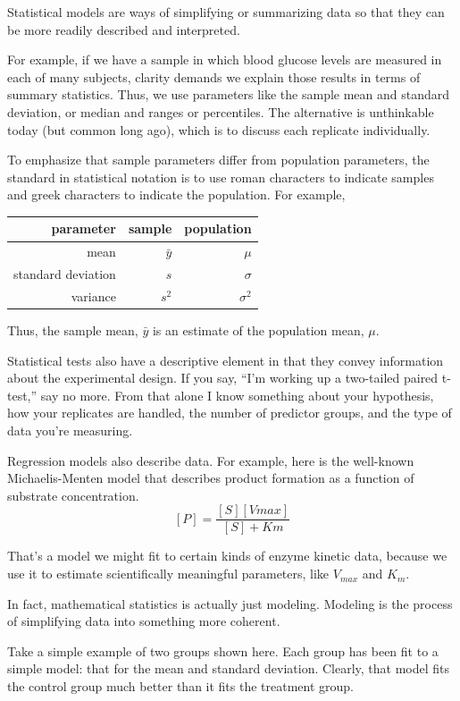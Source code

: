 \documentclass[]{book}
\begin{document}
Statistical models are ways of simplifying or summarizing data so that they can be more readily described and interpreted.

For example, if we have a sample in which blood glucose levels are measured in each of many subjects, clarity demands we explain those results in terms of summary statistics. Thus, we use parameters like the sample mean and standard deviation, or median and ranges or percentiles. The alternative is unthinkable today (but common long ago), which is to discuss each replicate individually.

To emphasize that sample parameters differ from population parameters, the standard in statistical notation is to use roman characters to indicate samples and greek characters to indicate the population. For example,

\begin{longtable}[]{@{}rrr@{}}
\toprule
parameter & sample & population\tabularnewline
\midrule
\endhead
mean & \(\bar y\) & \(\mu\)\tabularnewline
standard deviation & \(s\) & \(\sigma\)\tabularnewline
variance & \(s^2\) & \(\sigma^2\)\tabularnewline
\bottomrule
\end{longtable}

Thus, the sample mean, \(\bar y\) is an estimate of the population mean, \(\mu\).

Statistical tests also have a descriptive element in that they convey information about the experimental design. If you say, ``I'm working up a two-tailed paired t-test,'' say no more. From that alone I know something about your hypothesis, how your replicates are handled, the number of predictor groups, and the type of data you're measuring.

Regression models also describe data. For example, here is the well-known Michaelis-Menten model that describes product formation as a function of substrate concentration.\\
\[[P]=\frac{[S][Vmax]}{[S]+Km}\]

That's a model we might fit to certain kinds of enzyme kinetic data, because we use it to estimate scientifically meaningful parameters, like \(V_{max}\) and \(K_m\).

In fact, mathematical statistics is actually just modeling. Modeling is the process of simplifying data into something more coherent.

Take a simple example of two groups shown here. Each group has been fit to a simple model: that for the mean and standard deviation. Clearly, that model fits the control group much better than it fits the treatment group.
\end{document}
